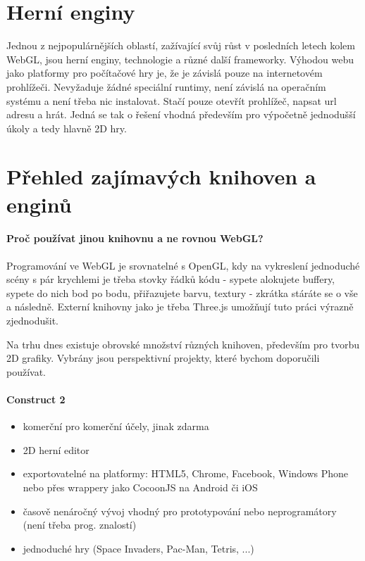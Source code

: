 \documentclass[12pt,a4paper,titlepage,final]{report}
\begin{document}
\section{Herní enginy}

Jednou z nejpopulárnějších oblastí, zažívající svůj růst v posledních letech kolem WebGL, jsou herní enginy, technologie a různé další frameworky. Výhodou webu jako platformy pro počítačové hry je, že je závislá pouze na internetovém prohlížeči. Nevyžaduje žádné speciální runtimy, není závislá na operačním systému a není třeba nic instalovat. Stačí pouze otevřít prohlížeč, napsat url adresu a hrát. Jedná se tak o řešení vhodná především pro výpočetně jednodušší úkoly a tedy 
hlavně 2D hry.

\section{Přehled zajímavých knihoven a enginů}

\paragraph{Proč používat jinou knihovnu a ne rovnou WebGL?} Programování ve WebGL je srovnatelné s OpenGL, kdy na vykreslení jednoduché scény s pár krychlemi je třeba stovky řádků kódu - sypete alokujete buffery, sypete do nich bod po bodu, přiřazujete barvu, textury - zkrátka stáráte se o vše a následně. Externí knihovny jako je třeba Three.js umožňují tuto práci výrazně zjednodušit.

Na trhu dnes existuje obrovské množství různých knihoven, především pro tvorbu 2D grafiky. Vybrány jsou perspektivní projekty, které bychom doporučili používat.

\paragraph{Construct 2}  \cite{construct2}

\begin{itemize}
	\item komerční pro komerční účely, jinak zdarma
	\item 2D herní editor
	\item exportovatelné na platformy: HTML5, Chrome, Facebook, Windows Phone nebo přes wrappery jako CocoonJS na Android či iOS
	\item časově nenáročný vývoj vhodný pro prototypování nebo neprogramátory (není třeba prog. znalostí)
	\item jednoduché hry (Space Invaders, Pac-Man, Tetris, ...)
\end{itemize}
\end{document}
